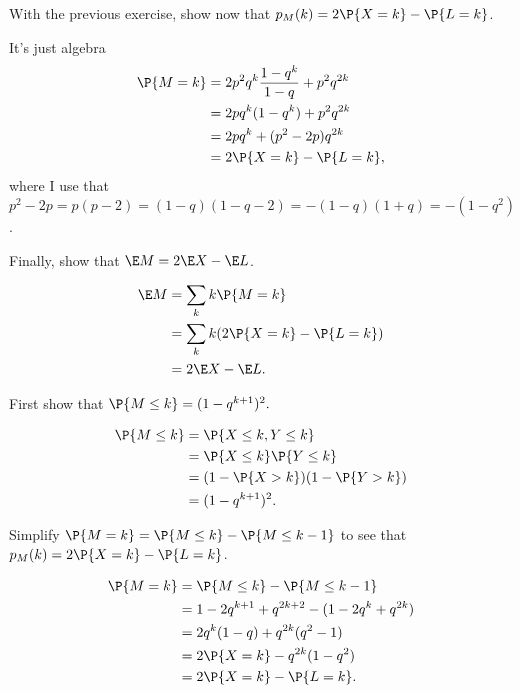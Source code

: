 \documentclass[a4paper]{article}
\begin{document}
\begin{exercise}
With the previous exercise, show now that \(p_M(k) =2 \P{X=k} - \P{L=k}\).
\begin{solution}
It's just algebra
  \begin{align*}
\P{M=k}
&=2 p^{2}q^{k}\frac{1-q^{k}}{1-q} +  p^{2}q^{2k}\\
&=2 pq^{k}(1-q^{k}) + p^{2}q^{2k}\\
&=2 pq^{k} +(p^{2}-2p) q^{2k}\\
&=2 \P{X=k} - \P{L=k},
  \end{align*}
where I use that \(p^{2}-2p = p(p-2) = (1-q)(1-q-2)=-(1-q)(1+q)=-(1-q^{2})\).
\end{solution}
\end{exercise}

\begin{exercise}
Finally, show that \(\E M = 2 \E X  - \E L\).
\begin{hint}
\end{hint}
\begin{solution}
  \begin{align*}
\E M
&= \sum_k k \P{M=k}     \\
&=  \sum_{k}k (2\P{X=k} - \P{L=k}) \\
&= 2 \E X  - \E L.
  \end{align*}
\end{solution}
\end{exercise}


\begin{exercise}
First show that  \(\P{M \leq k} = (1-q^{k+1})^{2}.\)
\begin{solution}
  \begin{align*}
\P{M\leq k}
&= \P{X\leq k, Y\leq k} \\
&= \P{X\leq k}\P{Y\leq k} \\
&= (1-\P{X> k})(1-\P{Y> k}) \\
&= (1-q^{k+1})^{2}.
  \end{align*}
\end{solution}
\end{exercise}

\begin{exercise}
Simplify \(\P{M=k} = \P{M\leq k} - \P{M\leq k-1}\) to see that \(p_M(k) = 2\P{X=k} - \P{L=k}\).
\begin{solution}
  \begin{align*}
\P{M=k} &= \P{M\leq k} - \P{M\leq k-1}\\
&= 1-2 q^{k+1} + q^{2k+2} - (1 - 2q^{k} + q^{2k})\\
&= 2 q^{k}(1-q) + q^{2k}(q^{2}-1) \\
&= 2 \P{X=k}  - q^{2k}(1-q^{2}) \\
&= 2 \P{X=k}  - \P{L=k}.
  \end{align*}
\end{solution}
\end{exercise}
\end{document}
